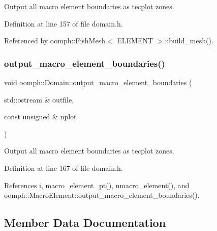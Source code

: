 Output all macro element boundaries as tecplot zones. 



Definition at line 157 of file domain.\+h.



Referenced by oomph\+::\+Fish\+Mesh$<$ E\+L\+E\+M\+E\+N\+T $>$\+::build\+\_\+mesh().

\mbox{\label{classoomph_1_1Domain_a59dfe3a2cff10aa2e12f86dba9584f15}} 
\subsubsection{\texorpdfstring{output\+\_\+macro\+\_\+element\+\_\+boundaries()}{output\_macro\_element\_boundaries()}\hspace{0.1cm}{\footnotesize\ttfamily [2/2]}}
{\footnotesize\ttfamily void oomph\+::\+Domain\+::output\+\_\+macro\+\_\+element\+\_\+boundaries (\begin{DoxyParamCaption}\item[{std\+::ostream \&}]{outfile,  }\item[{const unsigned \&}]{nplot }\end{DoxyParamCaption})\hspace{0.3cm}{\ttfamily [inline]}}



Output all macro element boundaries as tecplot zones. 



Definition at line 167 of file domain.\+h.



References i, macro\+\_\+element\+\_\+pt(), nmacro\+\_\+element(), and oomph\+::\+Macro\+Element\+::output\+\_\+macro\+\_\+element\+\_\+boundaries().



\subsection{Member Data Documentation}
\mbox{\label{classoomph_1_1Domain_a3a54693bb493f31acccadc62468dd7ae}} 
